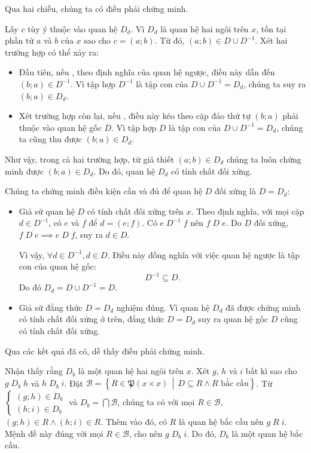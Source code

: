 Qua hai chiều, chúng ta có điều phải chứng minh.

\stepSubexercise Lấy $c$ tùy ý thuộc vào quan hệ $D_d$. Vì $D_d$ là quan hệ hai ngôi trên $x$, tồn tại phần tử $a$ và $b$ của $x$ sao cho $c = (a; b)$. Từ đó, $(a; b) \in D \cup D^{-1}$. Xét hai trường hợp có thể xảy ra:
\begin{itemize}
   \item Đầu tiên, nếu , theo định nghĩa của quan hệ ngược, điều này dẫn đến $(b; a) \in D^{-1}$. Vì tập hợp $D^{-1}$ là tập con của $D \cup D^{-1} = D_d$, chúng ta suy ra $(b; a) \in D_d$.
   \item Xét trường hợp còn lại, nếu , điều này kéo theo cặp đảo thứ tự $(b; a)$ phải thuộc vào quan hệ gốc $D$. Vì tập hợp $D$ là tập con của $D \cup D^{-1} = D_d$, chúng ta cũng thu được $(b; a) \in D_d$.
\end{itemize}
Như vậy, trong cả hai trường hợp, từ giả thiết $(a; b) \in D_d$ chúng ta luôn chứng minh được $(b; a) \in D_d$. Do đó, quan hệ $D_d$ có tính chất đối xứng.

Chúng ta chứng minh điều kiện cần và đủ để quan hệ $D$ đối xứng là $D = D_d$:

\begin{itemize}
   \item 
   Giả sử quan hệ $D$ có tính chất đối xứng trên $x$. Theo định nghĩa, với mọi cặp $d \in D^{-1}$, có $e$ và $f$ để $d = (e; f)$. Có $e\;D^{-1}\;f$ nên $f\;D\;e$. Do $D$ đối xứng, $f\;D\;e \implies e\;D\;f$, suy ra $d \in D$.
   
   Vì vậy, $\forall d \in D^{-1}, d \in D$. Điều này đồng nghĩa với việc quan hệ ngược là tập con của quan hệ gốc:
   $$
   D^{-1} \subseteq D.
   $$
   Do đó $D_d = D \cup D^{-1} = D.$
   \item Giả sử đẳng thức $D = D_d$ nghiệm đúng. Vì quan hệ $D_d$ đã được chứng minh có tính chất đối xứng ở trên, đẳng thức $D = D_d$ suy ra quan hệ gốc $D$ cũng có tính chất đối xứng.
\end{itemize}
   
Qua các kết quả đã có, dễ thấy điều phải chứng minh.

\stepSubexercise Nhận thấy rằng $D_b$ là một quan hệ hai ngôi trên $x$. Xét $g$, $h$ và $i$ bất kì sao cho $g\;D_b\;h$ và $h\;D_b\;i$. Đặt $\mathcal{B} = \left\{ R \in \mathfrak{P}(x \times x)\,\middle|\,D \subseteq R \land R\text{~bắc cầu}\right\}$. Từ $\begin{cases}
   (g; h) \in D_b \\
   (h; i) \in D_b
\end{cases}$ và $D_b = \bigcap \mathcal{B}$, chúng ta có với mọi $R \in \mathcal{B}$, $(g; h) \in R \land (h; i) \in R$. Thêm vào đó, có $R$ là quan hệ bắc cầu nên $g\;R\;i$. Mệnh đề này đúng với mọi $R \in \mathcal{B}$, cho nên $g\;D_b\;i$. Do đó, $D_b$ là một quan hệ bắc cầu.

